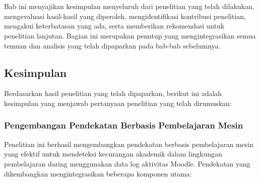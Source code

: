 \chapter{\babLima}
\label{bab:5}

Bab ini menyajikan kesimpulan menyeluruh dari penelitian yang telah dilakukan, mengevaluasi hasil-hasil yang diperoleh, mengidentifikasi kontribusi penelitian, mengakui keterbatasan yang ada, serta memberikan rekomendasi untuk penelitian lanjutan. Bagian ini merupakan penutup yang mengintegrasikan semua temuan dan analisis yang telah dipaparkan pada bab-bab sebelumnya.

\section{Kesimpulan}
\label{sec:kesimpulan}

Berdasarkan hasil penelitian yang telah dipaparkan, berikut ini adalah kesimpulan yang menjawab pertanyaan penelitian yang telah dirumuskan:

\subsection{Pengembangan Pendekatan Berbasis Pembelajaran Mesin}

Penelitian ini berhasil mengembangkan pendekatan berbasis pembelajaran mesin yang efektif untuk mendeteksi kecurangan akademik dalam lingkungan pembelajaran daring menggunakan data log aktivitas Moodle. Pendekatan yang dikembangkan mengintegrasikan beberapa komponen utama:

